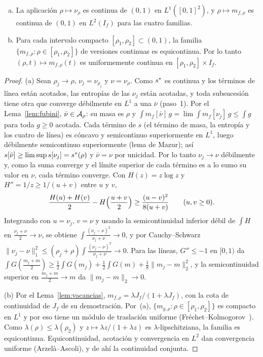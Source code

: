 \begin{proposicion}\label{prop:continuidad}
\begin{enumerate}[(a)]
\item La aplicación $\rho\mapsto\nu_\rho$ es continua de $(0,1)$ en $L^1([0,1]^2)$, y
$\rho\mapsto m_{f,\rho}$ es continua de $(0,1)$ en $L^2(I_f)$ para las cuatro familias.
\item Para cada intervalo compacto $[\rho_1,\rho_2]\subset(0,1)$, la familia
$\{m_{f,\rho}:\rho\in[\rho_1,\rho_2]\}$ de versiones continuas es equicontinua. Por lo tanto
$(\rho,t)\mapsto m_{f,\rho}(t)$ es uniformemente continua en $[\rho_1,\rho_2]\times I_f$.
\end{enumerate}
\end{proposicion}

\begin{proof}
(a) Sean $\rho_j\to\rho$, $\nu_j=\nu_{\rho_j}$ y $\nu=\nu_\rho$. Como $s^{*}$ es continua y los
términos de línea están acotados, las entropías de las $\nu_j$ están acotadas, y toda subsucesión
tiene otra que converge débilmente en $L^1$ a una $\bar\nu$ (paso~1). Por el Lema~\ref{lem:fubini},
$\bar\nu\in{\mathcal{A}}_\rho$: su masa es $\rho$ y $\int m_f[\bar\nu]\,g=\lim\int m_f[\nu_j]\,g\le\int g$
para toda $g\ge0$ acotada. Cada término de $s$ (el término de masa, la entropía y los cuatro de línea)
es cóncavo y semicontinuo superiormente en $L^1$, luego débilmente semicontinuo superiormente (lema
de Mazur); así $s[\bar\nu]\ge\limsup s[\nu_j]=s^{*}(\rho)$ y $\bar\nu=\nu$ por unicidad. Por lo tanto
$\nu_j\to\nu$ débilmente y, como la suma converge y el límite superior de cada término es a lo sumo
su valor en $\nu$, cada término converge. Con $H(z)=z\log z$ y $H''=1/z\ge1/(u+v)$ entre $u$ y $v$,
\[
 \frac{H(u)+H(v)}2-H\Bigl(\frac{u+v}2\Bigr)\ge\frac{(u-v)^2}{8(u+v)}\qquad(u,v\ge0).
\]
Integrando con $u=\nu_j$, $v=\nu$ y usando la semicontinuidad inferior débil de $\int H$ en
$\frac{\nu_j+\nu}2\to\nu$, se obtiene $\int\frac{(\nu_j-\nu)^2}{\nu_j+\nu}\to0$, y por Cauchy--Schwarz
$\|\nu_j-\nu\|_1^2\le(\rho_j+\rho)\int\frac{(\nu_j-\nu)^2}{\nu_j+\nu}\to0$. Para las líneas,
$G''\le-1$ en $[0,1)$ da
$\int G(\frac{m_j+m}2)\ge\frac12\int G(m_j)+\frac12\int G(m)+\frac18\|m_j-m\|_2^2$, y la
semicontinuidad superior en $\frac{m_j+m}2\to m$ da $\|m_j-m\|_2\to0$.

(b) Por el Lema~\ref{lem:vacancias}, $m_{f,\rho}=\lambda J_f/(1+\lambda J_f)$, con la cota de
continuidad de $J_f$ de su demostración. Por~(a), $\{m_{g,\rho}:\rho\in[\rho_1,\rho_2]\}$ es compacto
en $L^1$ y por eso tiene un módulo de traslación uniforme (Fréchet--Kolmogorov~\cite{Brezis}). Como
$\lambda(\rho)\le\lambda(\rho_2)$ y $z\mapsto\lambda z/(1+\lambda z)$ es $\lambda$-lipschitziana, la
familia es equicontinua. Equicontinuidad, acotación y convergencia en $L^2$ dan convergencia
uniforme (Arzelà--Ascoli), y de ahí la continuidad conjunta.
\end{proof}
